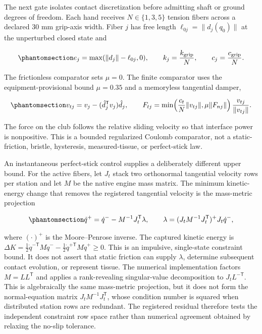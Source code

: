 \documentclass[
  letterpaper,
]{report}
\begin{document}
The next gate isolates contact discretization before admitting shaft or
ground degrees of freedom. Each hand receives \(N\in\{1,3,5\}\) tension
fibers across a declared 30 mm grip-axis width. Fiber \(j\) has free
length \(\ell_{0j}=\|d_j(q_0)\|\) at the unperturbed closed state and

\begin{equation}\phantomsection\label{eq-distributed-grip-fibers}{
e_j=\max(\|d_j\|-\ell_{0j},0),\qquad
k_j=\frac{k_{\mathrm{grip}}}{N},\qquad
c_j=\frac{c_{\mathrm{grip}}}{N}.
}\end{equation}

The frictionless comparator sets \(\mu=0\). The finite comparator uses
the equipment-provisional bound \(\mu=0.35\) and a memoryless tangential
damper,

\begin{equation}\phantomsection\label{eq-distributed-grip-friction}{
v_{tj}=v_j-(\hat d_j^\mathsf{T}v_j)\hat d_j,\qquad
F_{tj}=\min\!\left(\frac{c_t}{N}\|v_{tj}\|,
\mu\|F_{nj}\|\right)\frac{v_{tj}}{\|v_{tj}\|}.
}\end{equation}

The force on the club follows the relative sliding velocity so that
interface power is nonpositive. This is a bounded regularized Coulomb
comparator, not a static-friction, bristle, hysteresis, measured-tissue,
or perfect-stick law.

An instantaneous perfect-stick control supplies a deliberately different
upper bound. For the active fibers, let \(J_t\) stack two orthonormal
tangential velocity rows per station and let \(M\) be the native engine
mass matrix. The minimum kinetic-energy change that removes the
registered tangential velocity is the mass-metric projection

\begin{equation}\phantomsection\label{eq-distributed-grip-stick-projection}{
\dot q^+=\dot q^- - M^{-1}J_t^\mathsf{T}\lambda,
\qquad
\lambda=(J_tM^{-1}J_t^\mathsf{T})^+J_t\dot q^-,
}\end{equation}

where \((\cdot)^+\) is the Moore--Penrose inverse. The captured kinetic
energy is \(\Delta K=\tfrac12\dot q^{-\mathsf T}M\dot q^--
\tfrac12\dot q^{+\mathsf T}M\dot q^+\geq0\). This is an impulsive,
single-state constraint bound. It does not assert that static friction
can supply \(\lambda\), determine subsequent contact evolution, or
represent tissue. The numerical implementation factors
\(M=LL^\mathsf{T}\) and applies a rank-revealing singular-value
decomposition to \(J_tL^{-\mathsf{T}}\). This is algebraically the same
mass-metric projection, but it does not form the normal-equation matrix
\(J_tM^{-1}J_t^\mathsf{T}\), whose condition number is squared when
distributed station rows are redundant. The registered residual
therefore tests the independent constraint row space rather than
numerical agreement obtained by relaxing the no-slip tolerance.
\end{document}
